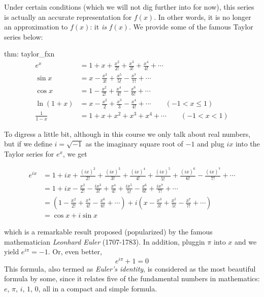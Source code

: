 Under certain conditions (which we will not dig further into for now), this series is actually an accurate representation for $f(x)$.  In other words, it is no longer an approximation to $f(x)$: it \textit{is} $f(x)$.  We provide some of the famous Taylor series below:

\begin{theo}{thm: taylor_fxn}
    \vspace{-0.5cm}
    \begin{align*}
        e^x &= 1 + x + \frac{x^2}{2!} + \frac{x^3}{3!} + \frac{x^4}{4!} + \cdots\\
        \sin x &= x - \frac{x^3}{3!} + \frac{x^5}{5!} - \frac{x^7}{7!} + \cdots\\
        \cos x &= 1 - \frac{x^2}{2!} + \frac{x^4}{4!} - \frac{x^6}{6!} + \cdots\\
        \ln(1+x) &= x - \frac{x^2}{2} + \frac{x^3}{3} - \frac{x^4}{4!} + \cdots \qquad (-1 < x \le 1)\\
        \frac{1}{1-x} &= 1 + x + x^2 + x^3 + x^4 + \cdots \qquad (-1 < x < 1)
    \end{align*}
\end{theo}

To digress a little bit, although in this course we only talk about real numbers, but if we define $i = \sqrt{-1}$ as the imaginary square root of $-1$ and plug $ix$ into the Taylor series for $e^x$, we get

\begin{align*}
    e^{ix} &= 1+ix+\frac{(ix)^2}{2!} + \frac{(ix)^3}{3!} + \frac{(ix)^4}{4!} + \frac{(ix)^5}{5!} + \frac{(ix)^6}{6!} - \frac{(ix)^7}{7!} + \cdots \\
    &= 1+ix-\frac{x^2}{2!} - \frac{ix^3}{3!} + \frac{x^4}{4!} + \frac{ix^5}{5!} - \frac{x^6}{6!} + \frac{ix^7}{7!} + \cdots \\
    &= \left(1 - \frac{x^2}{2!} + \frac{x^4}{4!} - \frac{x^6}{6!} + \cdots\right) + i\left(x - \frac{x^3}{3!} + \frac{x^5}{5!} - \frac{x^7}{7!} + \cdots\right)\\
    &= \cos x + i \sin x
\end{align*}

which is a remarkable result proposed (popularized) by the famous mathematician \textit{Leonhard Euler} (1707-1783).  In addition, pluggin $\pi$ into $x$ and we yield $e^{i\pi} = -1$. Or, even better,
\[e^{i\pi}+1 = 0\]
This formula, also termed as \textit{Euler's identity}, is considered as the most beautiful formula by some, since it relates five of the fundamental numbers in mathematics: $e$, $\pi$, $i$, $1$, $0$, all in a compact and simple formula.
\newpage

